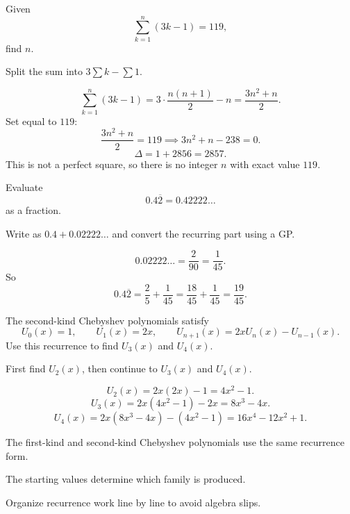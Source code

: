 \begin{problem}
Given
\[
\sum_{k=1}^{n}(3k-1)=119,
\]
find $n$.
\end{problem}
\begin{hint}
Split the sum into $3\sum k - \sum 1$.
\end{hint}
\begin{solution}
\[
\sum_{k=1}^{n}(3k-1)=3\cdot\frac{n(n+1)}{2}-n=\frac{3n^2+n}{2}.
\]
Set equal to $119$:
\[
\frac{3n^2+n}{2}=119 \implies 3n^2+n-238=0.
\]
\[
\Delta=1+2856=2857.
\]
This is not a perfect square, so there is no integer $n$ with exact value $119$.
\end{solution}

\begin{problem}
Evaluate
\[
0.4\overline{2}=0.42222\ldots
\]
as a fraction.
\end{problem}
\begin{hint}
Write as $0.4+0.02222\ldots$ and convert the recurring part using a GP.
\end{hint}
\begin{solution}
\[
0.02222\ldots=\frac{2}{90}=\frac{1}{45}.
\]
So
\[
0.4\overline{2}=\frac{2}{5}+\frac{1}{45}=\frac{18}{45}+\frac{1}{45}=\frac{19}{45}.
\]
\end{solution}

\begin{problem}
The second-kind Chebyshev polynomials satisfy
\[
U_0(x)=1,\qquad U_1(x)=2x,\qquad U_{n+1}(x)=2xU_n(x)-U_{n-1}(x).
\]
Use this recurrence to find $U_3(x)$ and $U_4(x)$.
\end{problem}
\begin{hint}
First find $U_2(x)$, then continue to $U_3(x)$ and $U_4(x)$.
\end{hint}
\begin{solution}
\[
U_2(x)=2x(2x)-1=4x^2-1.
\]
\[
U_3(x)=2x(4x^2-1)-2x=8x^3-4x.
\]
\[
U_4(x)=2x(8x^3-4x)-(4x^2-1)=16x^4-12x^2+1.
\]
\end{solution}
\begin{takeaways}
\item The first-kind and second-kind Chebyshev polynomials use the same recurrence form.
\item The starting values determine which family is produced.
\item Organize recurrence work line by line to avoid algebra slips.
\end{takeaways}


